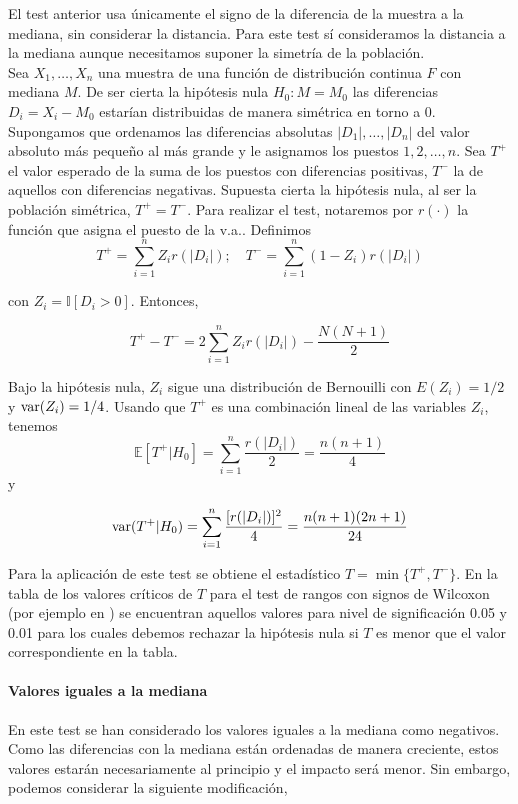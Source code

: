 	El test anterior usa únicamente el signo de la diferencia 
de la muestra a la mediana, sin considerar la distancia. Para 
este test sí consideramos la distancia a la mediana aunque 
necesitamos suponer la simetría de la población. \\
	Sea $X_1, \dots, X_n$ una muestra de una función de 
distribución continua $F$ con mediana $M$. De ser cierta la 
hipótesis nula $H_0: M = M_0$ las diferencias $D_i = X_i - 
M_0$ estarían distribuidas de manera simétrica en torno 
a 0.\\
	Supongamos que ordenamos las diferencias absolutas 
$|D_1|, \dots, |D_n|$ del valor absoluto más pequeño al más 
grande y le asignamos los puestos $1, 2, \dots, n$. Sea $T^+$ 
el valor esperado de la suma de los puestos con diferencias 
positivas, $T^-$ la de aquellos con diferencias negativas. 
Supuesta cierta la hipótesis nula, al ser la población 
simétrica, $T^+ = T^-$. Para realizar el test, notaremos por
$r(\cdot)$ la función que asigna el puesto de la v.a.. 
Definimos
	\[ T^+ = \sum\limits_{i=1}^n Z_i r(|D_i|); \quad
	   T^- = \sum\limits_{i=1}^n (1-Z_i) r(|D_i|) \]
	   
	 con $ Z_i = \mathbb{I}[ D_i > 0 ]$. Entonces,
	 		
	\[ T^+  - T^- = 2 \sum\limits_{i=1}^n
					 Z_i r(|D_i|) - \frac{N(N+1)}{2} \]
	
	Bajo la hipótesis nula, $Z_i$ sigue una distribución de 
Bernouilli con $E(Z_i) = 1/2$ y $\text{var}(Z_i) = 1/4$. Usando que 
$T^+$ es una combinación lineal de las variables $Z_i$, 
tenemos
	\[ \mathbb{E}[ T^+ | H_0 ] = \sum\limits_{i=1}^n 
						\frac{r(|D_i|)}{2} 
					= \frac{n(n+1)}{4}			\]
	y
	
	\[ \text{var}( T^+ | H_0 ) = \sum\limits_{i=1}^n 
						\frac{[r(|D_i|)]^2}{4} 
					= \frac{n(n+1)(2n+1)}{24}	\]
					
	Para la aplicación de este test se obtiene el estadístico 
$T = \min \{ T^+, T^- \}$. En la tabla de los valores 
críticos de $T$ para el test de rangos con signos de Wilcoxon 
(por ejemplo en \cite[Tabla A5]{sheskin2003handbook}) se encuentran aquellos valores 
para nivel de significación 0.05 y 0.01 para los cuales 
debemos rechazar la hipótesis nula si $T$ es menor que el 
valor correspondiente en la tabla.\\
	
\paragraph{Valores iguales a la mediana} En este test se han 
considerado los valores iguales a la mediana como negativos. 
Como las diferencias con la mediana están ordenadas de manera 
creciente, estos valores estarán necesariamente al principio 
y el impacto será menor. Sin embargo, podemos considerar la 
siguiente modificación,

